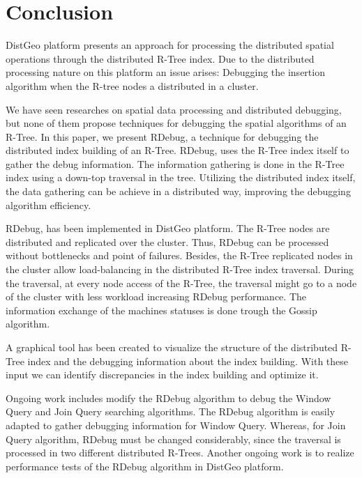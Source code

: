 \section{Conclusion}
\label{sec:conclusion}

DistGeo platform presents an approach for processing the distributed spatial operations through the distributed R-Tree index. Due to the distributed processing nature on this platform an issue arises: Debugging the insertion algorithm when the R-tree nodes a distributed in a cluster.

We have seen researches on spatial data processing and distributed debugging, but none of them propose techniques for debugging the spatial algorithms of an R-Tree. In this paper, we present RDebug, a technique for debugging the distributed index building of an R-Tree. RDebug, uses the R-Tree index itself to gather the debug information. The information gathering is done in the R-Tree index using a down-top traversal in the tree. Utilizing the distributed index itself, the data gathering can be achieve in a distributed way, improving the debugging algorithm efficiency.

RDebug, has been implemented in DistGeo platform. The R-Tree nodes are distributed and replicated over the cluster. Thus, RDebug can be processed without bottlenecks and point of failures. Besides, the R-Tree replicated nodes in the cluster allow load-balancing in the distributed R-Tree index traversal. During the traversal, at every node access of the R-Tree, the traversal might go to a node of the cluster with less workload increasing RDebug performance. The information exchange of the machines statuses is done trough the Gossip algorithm.

A graphical tool has been created to visualize the structure of the distributed R-Tree index and the debugging information about the index building. With these input we can identify discrepancies in the index building and optimize it.

Ongoing work includes modify the RDebug algorithm to debug the Window Query and Join Query searching algorithms. The RDebug algorithm is easily adapted to gather debugging information for Window Query. Whereas, for Join Query algorithm, RDebug must be changed considerably, since the traversal is processed in two different distributed R-Trees. Another ongoing work is to realize performance tests of the RDebug algorithm in DistGeo platform.